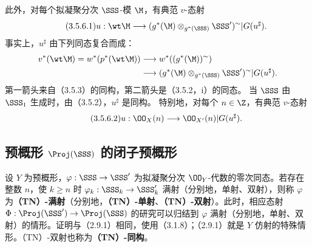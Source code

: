 此外，对每个拟凝聚分次 $\SSS$-模 $\M$，有典范 $v$-态射
\begin{equation}\tag{3.5.6.1}
u:\wt\M\longrightarrow
(g^*(\M)\otimes_{g^*(\SSS)}\SSS')^\sim|G(u^\sharp).
\end{equation}
事实上，$u^\sharp$ 由下列同态复合而成：
\[
\begin{aligned}
v^*(\wt\M)=w^*(p^*(\wt\M))
&\longrightarrow w^*((g^*(\M))^\sim)\\
&\longrightarrow(g^*(\M)\otimes_{g^*(\SSS)}\SSS')^\sim|G(u^\sharp).
\end{aligned}
\]
第一箭头来自（3.5.3）的同构，第二箭头是（3.5.2，i）的同态。
当 $\SSS$ 由 $\SSS_1$ 生成时，由（3.5.2），$u^\sharp$ 是同构。
特别地，对每个 $n\in\Z$，有典范 $v$-态射
\begin{equation}\tag{3.5.6.2}u:\OO_X(n)\longrightarrow\OO_{X'}(n)|G(u^\sharp).\end{equation}

\subsection{预概形 \texorpdfstring{$\Proj(\SSS)$}{Proj(S)} 的闭子预概形}
设 $Y$ 为预概形，$\varphi:\SSS\to\SSS'$ 为拟凝聚分次 $\OO_Y$-代数的零次同态。若存在整数 $n$，使 $k\geq n$ 时 $\varphi_k:\SSS_k\to\SSS'_k$ 满射（分别地，单射、双射），则称 $\varphi$ 为\textbf{（TN）-满射}（分别地，\textbf{（TN）-单射}、\textbf{（TN）-双射}）。此时，相应态射 $\Phi:\Proj(\SSS')\to\Proj(\SSS)$ 的研究可以归结到 $\varphi$ 满射（分别地，单射、双射）的情形。证明与（2.9.1）相同，使用（3.1.8）；（2.9.1）就是 $Y$ 仿射的特殊情形。（TN）-双射也称为\textbf{（TN）-同构}。


